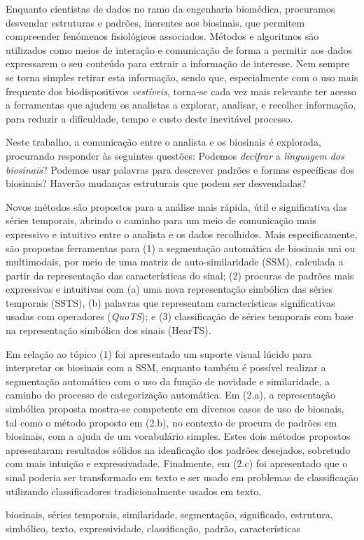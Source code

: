 
%

Enquanto cientistas de dados no ramo da engenharia biomédica, procuramos desvendar estruturas e padrões, inerentes aos biosinais, que permitem compreender fenómenos fisiológicos associados. Métodos e algoritmos são utilizados como meios de interação e comunicação de forma a permitir aos dados expressarem o seu conteúdo para extrair a informação de interesse. Nem sempre se torna simples retirar esta informação, sendo que, especialmente com o uso mais frequente dos biodispositivos \textit{vestíveis}, torna-se cada vez mais relevante ter acesso a ferramentas que ajudem os analistas a explorar, analisar, e recolher informação, para reduzir a dificuldade, tempo e custo deste inevitável processo.

Neste trabalho, a comunicação entre o analista e os biosinais é explorada, procurando responder às seguintes questões: Podemos \textit{decifrar} a \textit{linguagem dos biosinais}? Podemos usar palavras para descrever padrões e formas específicas dos biosinais? Haverão mudanças estruturais que podem ser desvendadas? 

Novos métodos são propostos para a análise mais rápida, útil e significativa das séries temporais, abrindo o caminho para um meio de comunicação mais expressivo e intuitivo entre o analista e os dados recolhidos. Mais especificamente, são propostas ferramentas para (1) a segmentação automática de biosinais uni ou multimodais, por meio de uma matriz de auto-similaridade (SSM), calculada a partir da representação das características do sinal; (2) procuras de padrões mais expressivas e intuitivas com (a) uma nova representação simbólica das séries temporais (SSTS), (b) palavras que representam características significativas usadas com operadores (\textit{QuoTS}); e (3) classificação de séries temporais com base na representação simbólica dos sinais (HearTS).

Em relação ao tópico (1) foi apresentado um suporte visual lúcido para interpretar os biosinais com a SSM, enquanto também é possível realizar a segmentação automático com o uso da função de novidade e similaridade, a caminho do processo de categorização automática. Em (2.a), a representação simbólica proposta mostra-se competente em diversos casos de uso de biosnais, tal como o método proposto em (2.b), no contexto de procura de padrões em biosinais, com a ajuda de um vocabulário simples. Estes dois métodos propostos apresentaram resultados sólidos na idenficação dos padrões desejados, sobretudo com mais intuição e expressivadade. Finalmente, em (2.c) foi apresentado que o sinal poderia ser transformado em texto e ser usado em problemas de classificação utilizando classificadores tradicionalmente usados em texto.

\begin{keywords}
biosinais, séries temporais, similaridade, segmentação, significado, estrutura, simbólico, texto, expressividade, classificação, padrão, características
\end{keywords}
